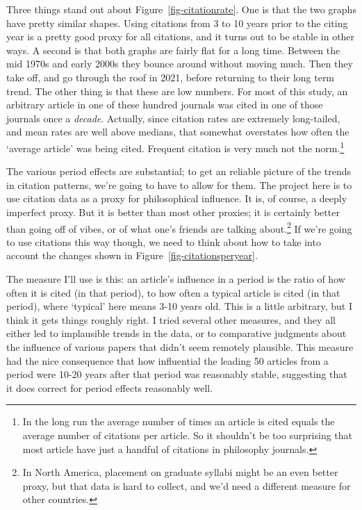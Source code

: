 \documentclass[
  12pt,
  letterpaper,
  DIV=11,
  numbers=noendperiod]{scrartcl}
\begin{document}
Three things stand out about Figure~\ref{fig-citationrate}. One is that
the two graphs have pretty similar shapes. Using citations from 3 to 10
years prior to the citing year is a pretty good proxy for all citations,
and it turns out to be stable in other ways. A second is that both
graphs are fairly flat for a long time. Between the mid 1970s and early
2000s they bounce around without moving much. Then they take off, and go
through the roof in 2021, before returning to their long term trend. The
other thing is that these are low numbers. For most of this study, an
arbitrary article in one of these hundred journals was cited in one of
those journals once a \emph{decade}. Actually, since citation rates are
extremely long-tailed, and mean rates are well above medians, that
somewhat overstates how often the `average article' was being cited.
Frequent citation is very much not the norm.\footnote{In the long run
  the average number of times an article is cited equals the average
  number of citations per article. So it shouldn't be too surprising
  that most article have just a handful of citations in philosophy
  journals.}

The various period effects are substantial; to get an reliable picture
of the trends in citation patterns, we're going to have to allow for
them. The project here is to use citation data as a proxy for
philosophical influence. It is, of course, a deeply imperfect proxy. But
it is better than most other proxies; it is certainly better than going
off of vibes, or of what one's friends are talking about.\footnote{In
  North America, placement on graduate syllabi might be an even better
  proxy, but that data is hard to collect, and we'd need a different
  measure for other countries.} If we're going to use citations this way
though, we need to think about how to take into account the changes
shown in Figure~\ref{fig-citationsperyear}.

The measure I'll use is this: an article's influence in a period is the
ratio of how often it is cited (in that period), to how often a typical
article is cited (in that period), where `typical' here means 3-10 years
old. This is a little arbitrary, but I think it gets things roughly
right. I tried several other measures, and they all either led to
implausible trends in the data, or to comparative judgments about the
influence of various papers that didn't seem remotely plausible. This
measure had the nice consequence that how influential the leading 50
articles from a period were 10-20 years after that period was reasonably
stable, suggesting that it does correct for period effects reasonably
well.
\end{document}
